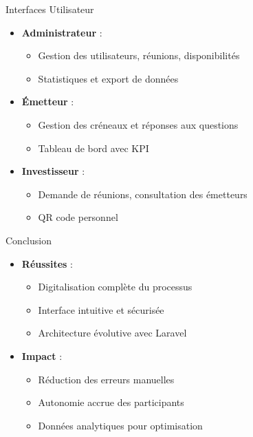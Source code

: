 \documentclass{beamer}
\begin{document}
\begin{frame}{Interfaces Utilisateur}
\begin{itemize}
    \item \textbf{Administrateur} :
    \begin{itemize}
        \item Gestion des utilisateurs, réunions, disponibilités
        \item Statistiques et export de données
    \end{itemize}
    \item \textbf{Émetteur} :
    \begin{itemize}
        \item Gestion des créneaux et réponses aux questions
        \item Tableau de bord avec KPI
    \end{itemize}
    \item \textbf{Investisseur} :
    \begin{itemize}
        \item Demande de réunions, consultation des émetteurs
        \item QR code personnel
    \end{itemize}
\end{itemize}
\end{frame}

\begin{frame}{Conclusion}
\begin{itemize}
    \item \textbf{Réussites} :
    \begin{itemize}
        \item Digitalisation complète du processus
        \item Interface intuitive et sécurisée
        \item Architecture évolutive avec Laravel
    \end{itemize}
    \item \textbf{Impact} :
    \begin{itemize}
        \item Réduction des erreurs manuelles
        \item Autonomie accrue des participants
        \item Données analytiques pour optimisation
    \end{itemize}
\end{itemize}
\end{frame}
\end{document}
